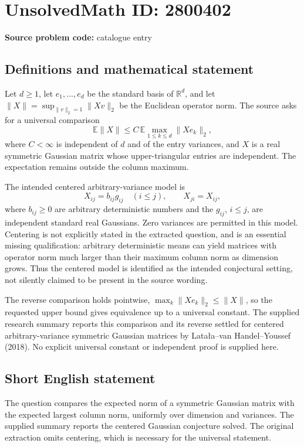 \documentclass[11pt]{article}
\newcommand{\R}{\mathbb{R}}
\begin{document}
\section*{UnsolvedMath ID: 2800402}
\textbf{Source problem code:} catalogue entry
\subsection{Definitions and mathematical statement}
Let $d\geq1$, let $e_1,\ldots,e_d$ be the standard basis of $\R^d$, and let $\|X\|=\sup_{\|v\|_2=1}\|Xv\|_2$ be the Euclidean operator norm. The source asks for a universal comparison
\[
\mathbb E\|X\|\leq C\,\mathbb E\max_{1\leq k\leq d}\|Xe_k\|_2,
\]
where $C<\infty$ is independent of $d$ and of the entry variances, and $X$ is a real symmetric Gaussian matrix whose upper-triangular entries are independent. The expectation remains outside the column maximum.

The intended centered arbitrary-variance model is
\[
X_{ij}=b_{ij}g_{ij}\quad(i\leq j),\qquad X_{ji}=X_{ij},
\]
where $b_{ij}\geq0$ are arbitrary deterministic numbers and the $g_{ij}$, $i\leq j$, are independent standard real Gaussians. Zero variances are permitted in this model. Centering is not explicitly stated in the extracted question, and is an essential missing qualification: arbitrary deterministic means can yield matrices with operator norm much larger than their maximum column norm as dimension grows. Thus the centered model is identified as the intended conjectural setting, not silently claimed to be present in the source wording.

The reverse comparison holds pointwise, $\max_k\|Xe_k\|_2\leq\|X\|$, so the requested upper bound gives equivalence up to a universal constant. The supplied research summary reports this comparison and its reverse settled for centered arbitrary-variance symmetric Gaussian matrices by Lata\l a--van Handel--Youssef (2018). No explicit universal constant or independent proof is supplied here.
\subsection{Short English statement}
The question compares the expected norm of a symmetric Gaussian matrix with the expected largest column norm, uniformly over dimension and variances. The supplied summary reports the centered Gaussian conjecture solved. The original extraction omits centering, which is necessary for the universal statement.
\end{document}
